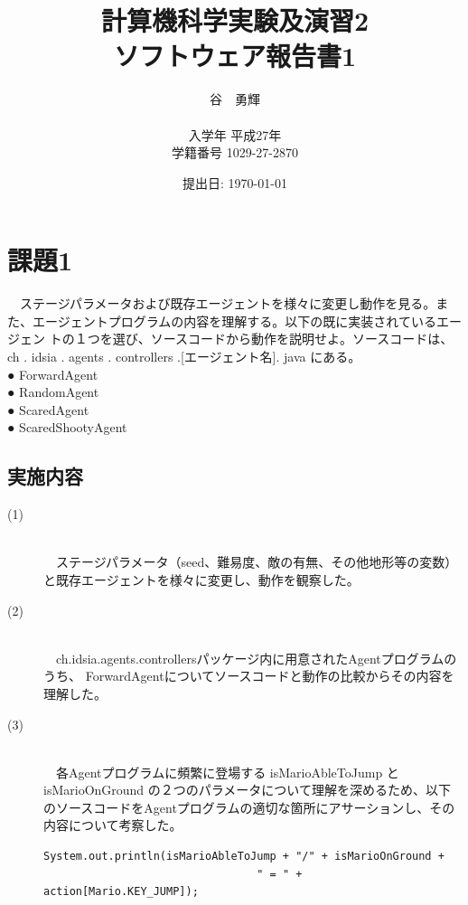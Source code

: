 \documentclass[a4j]{jarticle}
\begin{document}
\title{計算機科学実験及演習2 \\ \bf ソフトウェア報告書1}
\author{谷　勇輝 \\ \\入学年 平成27年 \\ 学籍番号 1029-27-2870}
\date{提出日: \today} %
\maketitle

\section{課題1}
\begin{screen}
　ステージパラメータおよび既存エージェントを様々に変更し動作を見る。また、エージェントプログラムの内容を理解する。以下の既に実装されているエージェン
トの１つを選び、ソースコードから動作を説明せよ。ソースコードは、ch . idsia . agents . controllers .[エージェント名]. java にある。\\
● ForwardAgent \\
● RandomAgent \\
● ScaredAgent \\
● ScaredShootyAgent 
\end{screen}
\subsection{実施内容}
\begin{description}
\item[(1)]~\\
　ステージパラメータ（seed、難易度、敵の有無、その他地形等の変数）と既存エージェントを様々に変更し、動作を観察した。
\item[(2)]~\\
　ch.idsia.agents.controllersパッケージ内に用意されたAgentプログラムのうち、
ForwardAgentについてソースコードと動作の比較からその内容を理解した。
\item[(3)]~\\
　各Agentプログラムに頻繁に登場する isMarioAbleToJump と isMarioOnGround の２つのパラメータについて理解を深めるため、以下のソースコードをAgentプログラムの適切な箇所にアサーションし、その内容について考察した。
\begin{verbatim}
System.out.println(isMarioAbleToJump + "/" + isMarioOnGround + 
                                 " = " + action[Mario.KEY_JUMP]);
\end{verbatim}
\end{description}
\end{document}

